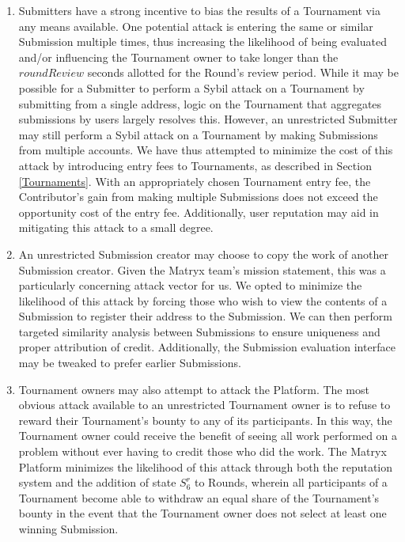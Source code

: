 \documentclass[a4paper, 10pt, conference]{ieeeconf}      %
\begin{document}
\begin{enumerate}
    \item  Submitters have a strong incentive to bias the results of a Tournament via any means available. 
One potential attack is entering the same or similar Submission multiple times, thus increasing the likelihood of being evaluated and/or influencing the Tournament owner to take longer than the $roundReview$ seconds allotted for the Round's review period. While it may be possible for a Submitter to perform a Sybil attack on a Tournament by submitting from a single address, logic on the Tournament that aggregates submissions by users largely resolves this. However, an unrestricted Submitter may still perform a Sybil attack on a Tournament by making Submissions from multiple accounts. We have thus attempted to minimize the cost of this attack by introducing entry fees to Tournaments, as described in Section \ref{Tournaments}. With an appropriately chosen Tournament entry fee, the Contributor’s gain from making multiple Submissions does not exceed the opportunity cost of the entry fee. Additionally, user reputation may aid in mitigating this attack to a small degree.
\item An unrestricted Submission creator may choose to copy the work of another Submission creator. Given the Matryx team's mission statement, this was a particularly concerning attack vector for us. We opted to minimize the likelihood of this attack by forcing those who wish to view the contents of a Submission to register their address to the Submission. We can then perform targeted similarity analysis between Submissions to ensure uniqueness and proper attribution of credit. Additionally, the Submission evaluation interface may be tweaked to prefer earlier Submissions.
\item Tournament owners may also attempt to attack the Platform. The most obvious attack available to an unrestricted Tournament owner is to refuse to reward their Tournament's bounty to any of its participants. In this way, the Tournament owner could receive the benefit of seeing all work performed on a problem without ever having to credit those who did the work.
The Matryx Platform minimizes the likelihood of this attack through both the reputation system and the addition of state $S_{6}^r$ to Rounds, wherein all participants of a Tournament become able to withdraw an equal share of the Tournament's bounty in the event that the Tournament owner does not select at least one winning Submission.


\end{enumerate}
\end{document}

